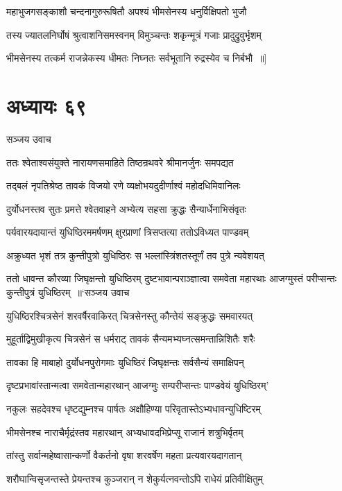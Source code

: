 \twolineshloka
{महाभुजगसङ्काशौ चन्दनागुरुरूषितौ}
{अपश्यं भीमसेनस्य धनुर्विक्षिपतो भुजौ}


\twolineshloka
{तस्य ज्यातलनिर्घोषं श्रुत्वाशनिसमस्वनम्}
{विमुञ्चन्तः शकृन्मूत्रं गजाः प्रादुद्रुवुर्भृशम्}


\twolineshloka
{भीमसेनस्य तत्कर्म राजन्नेकस्य धीमतः}
{निघ्नतः सर्वभूतानि रुद्रस्येव च निर्बभौ ॥]}


\chapter{अध्यायः ६९}
\twolineshloka
{सञ्जय उवाच}
{}


\twolineshloka
{ततः श्वेताश्वसंयुक्ते नारायणसमाहिते}
{तिष्ठन्रथवरे श्रीमानर्जुनः समपद्यत}


\twolineshloka
{तद्बलं नृपतिश्रेष्ठ तावकं विजयो रणे}
{व्यक्षोभयदुदीर्णाश्वं महोदधिमिवानिलः}


\twolineshloka
{दुर्योधनस्तव सुतः प्रमत्ते श्वेतवाहने}
{अभ्येत्य सहसा क्रुद्धः सैन्यार्धेनाभिसंवृतः}


\twolineshloka
{पर्यवारयदायान्तं युधिष्ठिरममर्षणम्}
{क्षुरप्राणां त्रिसप्तत्या ततोऽविध्यत पाण्डवम्}


\twolineshloka
{अक्रुध्यत भृशं तत्र कुन्तीपुत्रो युधिष्ठिरः}
{स भल्लांस्त्रिंशतस्तूर्णं तव पुत्रे न्यवेशयत्}


ततो धावन्त कौरव्या जिघृक्षन्तो युधिष्ठिरम्
\threelineshloka
{दुष्टभावान्पराञ्ज्ञात्वा समवेता महारथाः}
{आजग्मुस्तं परीप्सन्तः कुन्तीपुत्रं युधिष्ठिरम् ॥`सञ्जय उवाच}
{}


\twolineshloka
{युधिष्ठिरश्चित्रसेनं शरवर्षैरवाकिरत्}
{चित्रसेनस्तु कौन्तेयं सङ्क्रुद्धः समवारयत्}


\twolineshloka
{मुहूर्ताद्विमुखीकृत्य चित्रसेनं स धर्मराट्}
{तावकं सैन्यमभ्यघ्नत्समन्तान्निशितैः शरैः}


\twolineshloka
{तावका हि माबाहो दुर्योधनपुरोगमाः}
{युधिष्ठिरं जिघृक्षन्तः सर्वसैन्यं समाक्षिपन्}


\twolineshloka
{दृष्टप्रभावांस्तान्मत्वा समवेतान्महारथान्}
{आजग्मुः सम्परीप्सन्तः पाण्डवेयं युधिष्ठिरम्'}


\twolineshloka
{नकुलः सहदेवश्च धृष्टद्युम्नश्च पार्षतः}
{अक्षौहिण्या परिवृतास्तेऽभ्यधावन्युधिष्टिरम्}


\twolineshloka
{भीमसेनश्च नाराचैर्मृद्रंस्तव महारथान्}
{अभ्यधावदभिप्रेप्सू राजानं शत्रुभिर्वृतम्}


\twolineshloka
{तांस्तु सर्वान्महेष्वासान्कर्णो वैकर्तनो वृषा}
{शरवर्षेण महता प्रत्यवारयदागतान्}


\twolineshloka
{शरौघान्विसृजन्तस्ते प्रेयन्तश्च कुञ्जरान्}
{न शेकुर्यत्नवन्तोऽपि राधेयं प्रतिवीक्षितुम्}


